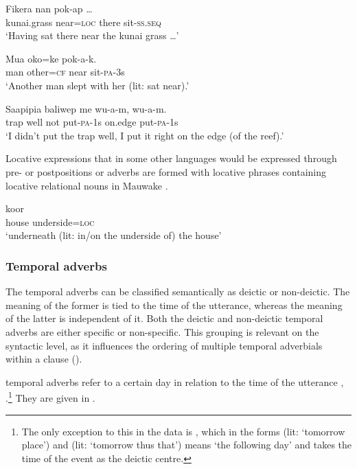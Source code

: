 \ea%
\label{ex:3:x469}
\gll Fikera  nan pok-ap {\dots} \\
kunai.grass near=\textsc{loc} there sit-\textsc{ss}.\textsc{seq} \\
\glt`Having sat there near the kunai grass {\dots}'
\z

\ea%
\label{ex:3:x1856}
\gll Mua oko=ke  pok-a-k. \\
man other=\textsc{cf} near sit-\textsc{pa}-3s\\
\glt`Another man slept with her (lit: sat near).'
\z

\ea%
\label{ex:3:x470}
\gll Saapipia baliwep me wu-a-m,  wu-a-m. \\
trap well not put-\textsc{pa}-1s on.edge put-\textsc{pa}-1s\\
\glt`I didn't put the trap well, I put it right on the edge (of the reef).'
\z

Locative expressions that in some other languages would be expressed through pre- or postpositions or adverbs are formed with locative phrases containing locative relational nouns in Mauwake . 

\ea%
\label{ex:3:x468}
\gll koor  \\
house underside=\textsc{loc}\\
\glt`underneath (lit: in/on the underside of) the house'
\z

\subsubsection{Temporal adverbs}\label{sec:3.9.1.2}
{}
The temporal adverbs can be classified semantically as deictic or non-deictic. The meaning of the former is tied to the time of the utterance, whereas the meaning of the latter is independent of it. Both the deictic and non-deictic temporal adverbs are either specific or non-specific. This grouping is relevant on the syntactic level, as it influences the ordering of multiple temporal adverbials within a clause ().

 temporal adverbs refer to a certain day in relation to the time of the utterance , .\footnote{The only exception to this in the data is , which in the forms  (lit: `tomorrow place') and  (lit: `tomorrow thus that') means `the following day' and takes the time of the event as the deictic centre.} They are given in .

